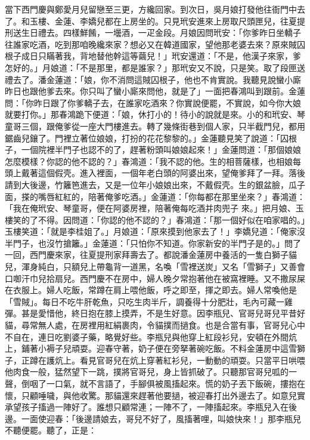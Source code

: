 當下西門慶與鄭愛月兒留戀至三更，方纔回家。到次日，吳月娘打發他往衙門中去了。和玉樓、金蓮、李嬌兒都在上房坐的。只見玳安進來上房取尺頭匣兒，往夏提刑送生日禮去。四樣鮮餚，一壜酒，一疋金段。月娘因問玳安：「你爹昨日坐轎子往誰家吃酒，吃到那咱晚纔來家？想必又在韓道國家，望他那老婆去來？原來賊囚根子成日只瞞著我，背地替他幹這等繭兒！」玳安還道：「不是，他漢子來家，爹怎好的。」月娘道：「不是那里，都是誰家？」那玳安又不說，只是笑。取了段匣送禮去了。潘金蓮道：「娘，你不消問這賊囚根子，他也不肯實說。我聽見說蠻小廝昨日也跟他爹去來。你只叫了蠻小廝來問他，就是了」一面把春鴻叫到跟前。金蓮問：「你昨日跟了你爹轎子去，在誰家吃酒來？你實說便罷，不實說，如今你大娘就要打你。」那春鴻跪下便道：「娘，休打小的！待小的說就是來。小的和玳安、琴童哥三個，跟俺爹從一座大門樓進去。轉了幾條街巷到個人家，只半截門兒，都用鋸齒兒鑲了。門裡立著位娘娘，打扮的花花黎黎的。」金蓮聽見笑了說道：「囚根子，一個院裡半門子也認不的了，趕著粉頭叫娘娘起來！」金蓮問道：「那個娘娘怎麼模樣？你認的他不認的？」春鴻道：「我不認的他。生的相菩薩樣，也相娘每頭上戴著這個假壳。進入裡面，一個年老白頭的阿婆出來，望俺爹拜了一拜。落後請到大後邊，竹籬笆進去，又是一位年小娘娘出來，不戴假壳。生的銀盆臉，瓜子面，搽的嘴唇紅紅的，陪著俺爹吃酒。」金蓮道：「你每都在那里坐來？」春鴻道：「我在俺玳安、琴童哥，便在阿婆房裡，陪著俺每吃酒并肉兜子 來。」把月娘、玉樓笑的了不得。因問道：「你認的他不認的？」春鴻道：「那一個好似在咱家唱的。」玉樓笑道：「就是李桂姐了。」月娘道：「原來摸到他家去了！」李嬌兒道：「俺家沒半門子，也沒竹搶籬。」金蓮道：「只怕你不知道。你家新安的半門子是的。」問了一回，西門慶來家，往夏提刑家拜壽去了。都說潘金蓮房中養活的一隻白獅子貓兒，渾身純白，只額兒上帶龜背一道黑，名喚「雪裡送炭」又名「雪獅子」又善會口啣汗巾兒拾扇兒。西門慶不在房中，婦人晚夕常抱著他在被窩裡睡。又不撒尿屎在衣服上。婦人吃飯，常蹲在肩上喂他飯，呼之即至，揮之即去。婦人常喚他是「雪賊」。每日不吃牛肝乾魚，只吃生肉半斤，調養得十分肥壯，毛內可藏一雞彈。甚是愛惜他，終日抱在膝上摸弄，不是生好意。因李瓶兒、官哥兒哥兒平昔好貓，尋常無人處，在房裡用紅絹裹肉，令貓撲而撾食。也是合當有事，官哥兒心中不自在，連日吃劉婆子藥，略覺好些。李瓶兒與他穿上紅段衫兒，安頓在外間炕上，鋪著小褥子兒頑耍。迎春守著，奶子便在旁拏著碗吃飯。不料金蓮房中這雪獅子，正蹲在護炕上。看見官哥兒在炕上穿著紅衫兒，一動動的頑耍。只當平日哄喂他肉食一般，猛然望下一跳，撲將官哥兒，身上皆抓破了。只聽那官哥兒呱的一聲，倒咽了一口氣，就不言語了，手腳俱被風搐起來。慌的奶子丟下飯碗，摟抱在懷，只顧唾噦，與他收驚。那貓還來趕著他要撾，被迎春打出外邊去了。如意兒實承望孩子搐過一陣好了。誰想只顧常連；一陣不了，一陣搐起來。李瓶兒入在後邊。一面使迎春：「後邊請娘去，哥兒不好了，風搐著哩，叫娘快來！」那李瓶兒不聽便罷。聽了，正是：

